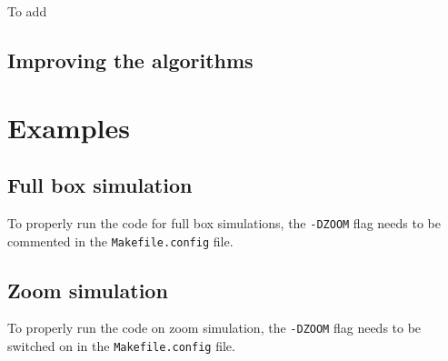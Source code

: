\documentclass{article}
\begin{document}
To add 

\subsection{Improving the algorithms}

\section{Examples}

\subsection{Full box simulation}
To properly run the code for full box simulations, the \texttt{-DZOOM} flag needs to be commented in the \texttt{Makefile.config} file.

\subsection{Zoom simulation}
To properly run the code on zoom simulation, the \texttt{-DZOOM} flag needs to be switched on in the \texttt{Makefile.config} file.
\end{document}
